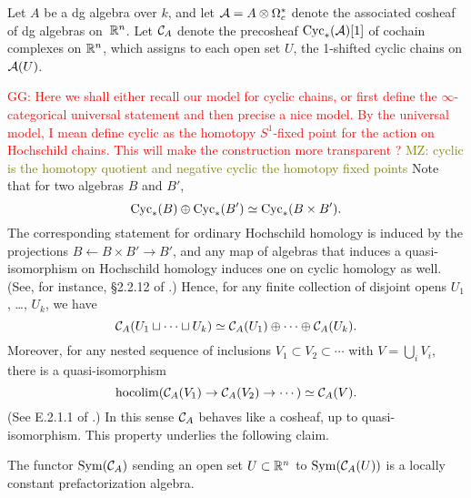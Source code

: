 \documentclass[11pt]{amsart}
\numberwithin{equation}{section}
\def\owen{\textcolor{magenta}{OG: }\textcolor{magenta}}
\def\mahmoud{\textcolor{olive}{MZ: }\textcolor{olive}}
\def\greg{\textcolor{red}{GG: }\textcolor{red}}
\begin{document}
\begin{dfn}
Let $A$ be a dg algebra over $k$, and let $\mathcal A = A \otimes \Omega^*_c$ denote the associated cosheaf of dg algebras on~$\mathbb R^n$.
Let $\mathcal C_A$ denote the precosheaf ${\rm Cyc}_*(\mathcal A)[1]$ of cochain complexes on $\mathbb R^n$,
which assigns to each open set $U$, the 1-shifted cyclic chains on $\mathcal A(U)$.
\end{dfn}
\greg{Here we shall either recall our model for cyclic chains, or first define the $\infty$-categorical universal statement and then precise a nice model. By the universal model, I mean define cyclic as the homotopy $S^1$-fixed point for the action on Hochschild chains. This will make the construction more transparent ?}
\mahmoud{cyclic is the homotopy quotient and negative cyclic the homotopy fixed points}
Note that for two algebras $B$ and $B'$,
\[
{\rm Cyc}_*(B) \oplus {\rm Cyc}_*(B') \simeq {\rm Cyc}_*(B \times B') .
\] 
The corresponding statement for ordinary Hochschild homology is induced by the projections $B \leftarrow B \times B' \to B'$, and any map of algebras that induces a quasi-isomorphism on Hochschild homology induces one on cyclic homology as well.
(See, for instance, \S2.2.12 of \cite{LodayCyclic}.)
Hence, for any finite collection of disjoint opens $U_1$, \dots, $U_k$, 
we have
\[
\mathcal C_A(U_1 \sqcup \cdots \sqcup U_k) \simeq \mathcal C_A(U_1) \oplus \cdots \oplus \mathcal C_A(U_k).
\]
Moreover, for any nested sequence of inclusions $V_1 \subset V_2 \subset \cdots$ with $V = \bigcup_i V_i$,
there is a quasi-isomorphism
\[
{\rm hocolim}(\mathcal C_A(V_1) \to \mathcal C_A(V_2) \to \cdots) \simeq \mathcal C_A(V).
\]
(See E.2.1.1 of \cite{LodayCyclic}.)
In this sense $\mathcal C_A$ behaves like a cosheaf, up to quasi-isomorphism. 
This property underlies the following claim.

\begin{lmm}
\label{lem: cycfact}
The functor ${\rm Sym}(\mathcal C_A)$ sending an open set $U \subset \mathbb R^n$ to ${\rm Sym}(\mathcal C_A(U))$ is a locally constant prefactorization algebra.
\end{lmm}

\end{document}
